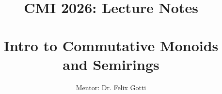 \documentclass[11pt]{amsart}
\title{CMI 2026: Lecture Notes \\ \phantom{blank} \\ Intro to Commutative Monoids and Semirings}
\author{Mentor: Dr. Felix Gotti}
\begin{document}
\mbox{}
\bigskip
\maketitle
\def\ISBLUEPRINT{1}

\end{document}
